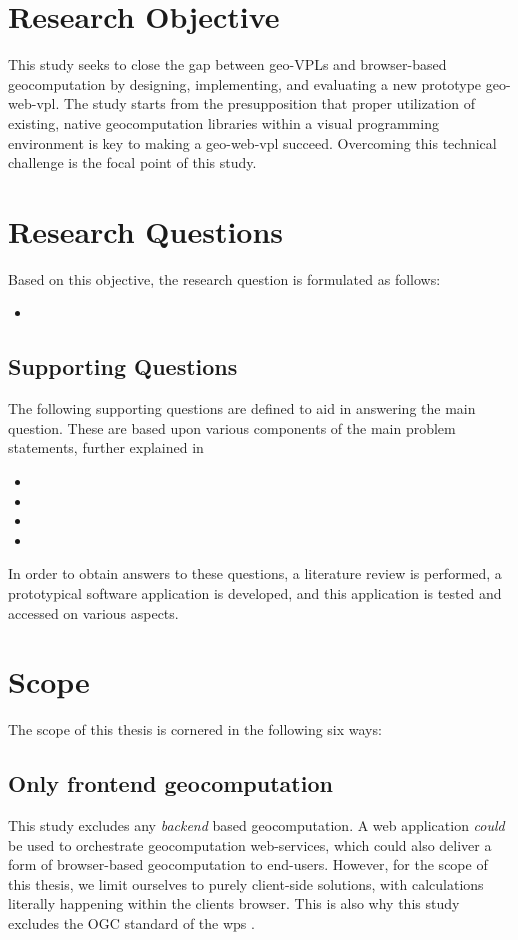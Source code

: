 
\section{Research Objective}

This study seeks to close the gap between geo-VPLs and browser-based geocomputation by designing, implementing, and evaluating a new prototype \ac{geo-web-vpl}.
The study starts from the presupposition that proper utilization of existing, native geocomputation libraries within a visual programming environment is key to making a geo-web-vpl succeed. 
Overcoming this technical challenge is the focal point of this study. 

\section{Research Questions}
Based on this objective, the research question is formulated as follows: 
\begin{itemize}[ ]
  \item \myMainRQ
\end{itemize}

\subsection*{Supporting Questions}
The following supporting questions are defined to aid in answering the main question.
These are based upon various components of the main problem statements, further explained in 
\begin{itemize}[-]
  \item \mySubRQOne
  \item \mySubRQTwo
  \item \mySubRQThree
  \item \mySubRQFour
\end{itemize}
In order to obtain answers to these questions, a literature review is performed,
a prototypical software application is developed, 
and this application is tested and accessed on various aspects.

\newpage
\section{Scope}
The scope of this thesis is cornered in the following six ways: 

\subsection*{Only frontend geocomputation}
This study excludes any \emph {backend} based geocomputation.
A web application \textit{could} be used to orchestrate geocomputation web-services, which could also deliver a form of browser-based geocomputation to end-users. 
However, for the scope of this thesis, we limit ourselves to purely client-side solutions, with calculations literally happening within the clients browser. 
This is also why this study excludes the OGC standard of the \ac{wps} \cite{ogc_web_2015}.

